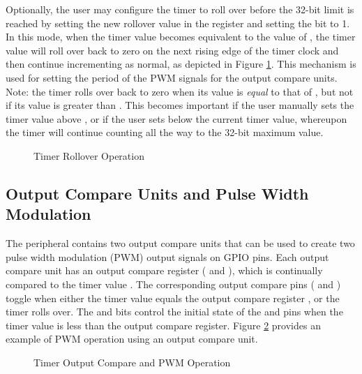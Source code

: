 Optionally, the user may configure the timer to roll over before the 32-bit limit is reached by setting the new rollover value in the  register and setting the  bit to 1. In this mode, when the timer value becomes equivalent to the value of , the timer value will roll over back to zero on the next rising edge of the timer clock and then continue incrementing as normal, as depicted in Figure \ref{fig:timer-rollover-operation}. This mechanism is used for setting the period of the PWM signals for the output compare units. Note: the timer rolls over back to zero when its value is \textit{equal} to that of , but not if its value is greater than . This becomes important if the user manually sets the timer value above , or if the user sets  below the current timer value, whereupon the timer will continue counting all the way to the 32-bit maximum value.

\begin{figure}[htpb]
	
	\caption{Timer Rollover Operation}
	\label{fig:timer-rollover-operation}
\end{figure}




\subsection{Output Compare Units and Pulse Width Modulation}

The  peripheral contains two output compare units that can be used to create two pulse width modulation (PWM) output signals on GPIO pins. Each output compare unit has an output compare register ( and ), which is continually compared to the timer value . The corresponding output compare pins ( and ) toggle when either the timer value  equals the output compare register , or the timer rolls over. The  and  bits control the initial state of the  and  pins when the timer value is less than the output compare register. Figure \ref{fig:timer-output-compare-operation} provides an example of PWM operation using an output compare unit.

\begin{figure}[htpb]
	
	\caption{Timer Output Compare and PWM Operation}
	\label{fig:timer-output-compare-operation}
\end{figure}




